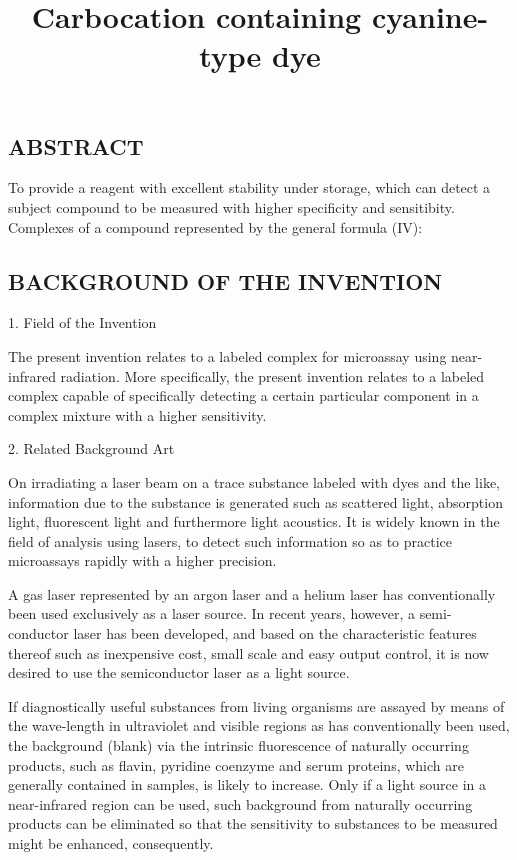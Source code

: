 \documentclass[11pt,a4paper]{article}
\title{Carbocation containing cyanine-type dye}
\begin{document}
\maketitle

\subsection{ABSTRACT}

To provide a reagent with excellent stability under storage, which can detect a subject compound to be measured with higher specificity and sensitibity. Complexes of a compound represented by the general formula (IV):

\subsection{BACKGROUND OF THE INVENTION}

1. Field of the Invention

The present invention relates to a labeled complex for microassay using near-infrared radiation. More specifically, the present invention relates to a labeled complex capable of specifically detecting a certain particular component in a complex mixture with a higher sensitivity.

2. Related Background Art

On irradiating a laser beam on a trace substance labeled with dyes and the like, information due to the substance is generated such as scattered light, absorption light, fluorescent light and furthermore light acoustics. It is widely known in the field of analysis using lasers, to detect such information so as to practice microassays rapidly with a higher precision.

A gas laser represented by an argon laser and a helium laser has conventionally been used exclusively as a laser source. In recent years, however, a semi-conductor laser has been developed, and based on the characteristic features thereof such as inexpensive cost, small scale and easy output control, it is now desired to use the semiconductor laser as a light source.

If diagnostically useful substances from living organisms are assayed by means of the wave-length in ultraviolet and visible regions as has conventionally been used, the background (blank) via the intrinsic fluorescence of naturally occurring products, such as flavin, pyridine coenzyme and serum proteins, which are generally contained in samples, is likely to increase. Only if a light source in a near-infrared region can be used, such background from naturally occurring products can be eliminated so that the sensitivity to substances to be measured might be enhanced, consequently.
\end{document}
